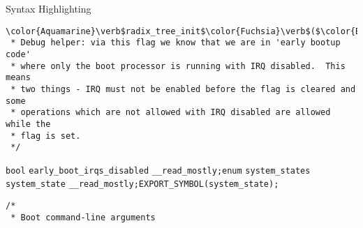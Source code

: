 \begin{frame}{Syntax Highlighting}
\begin{verbatim}
\color{Aquamarine}\verb$radix_tree_init$\color{Fuchsia}\verb$($\color{BurntOrange}\verb$void$\color{Fuchsia}\verb$)$\color{Fuchsia}\verb$;$\newline\newline\color{Rhodamine}\begin{verbatim}/*
 * Debug helper: via this flag we know that we are in 'early bootup code'
 * where only the boot processor is running with IRQ disabled.  This means
 * two things - IRQ must not be enabled before the flag is cleared and some
 * operations which are not allowed with IRQ disabled are allowed while the
 * flag is set.
 */\end{verbatim}\leavevmode\newline\color{Aquamarine}\verb$bool$ \color{Aquamarine}\verb$early_boot_irqs_disabled$ \color{Aquamarine}\verb$__read_mostly$\color{Fuchsia}\verb$;$\newline\newline\color{BurntOrange}\verb$enum$ \color{Aquamarine}\verb$system_states$ \color{Aquamarine}\verb$system_state$ \color{Aquamarine}\verb$__read_mostly$\color{Fuchsia}\verb$;$\newline\color{Aquamarine}\verb$EXPORT_SYMBOL$\color{Fuchsia}\verb$($\color{Aquamarine}\verb$system_state$\color{Fuchsia}\verb$)$\color{Fuchsia}\verb$;$\newline\newline\color{Rhodamine}\begin{verbatim}/*
 * Boot command-line arguments

\end{verbatim}
\end{frame}
